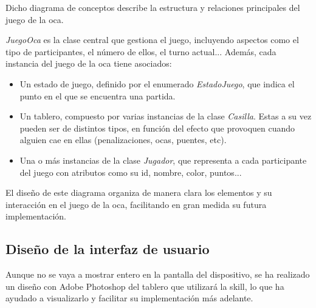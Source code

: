 Dicho diagrama de conceptos describe la estructura y relaciones principales del juego de la oca. 

\textit{JuegoOca} es la clase central que gestiona el juego, incluyendo aspectos como el tipo de participantes, el número de ellos, el turno actual... Además, cada instancia del juego de la oca tiene asociados:
\begin{itemize}
	\item Un estado de juego, definido por el enumerado \textit{EstadoJuego}, que indica el punto en el que se encuentra una partida.
	\item Un tablero, compuesto por varias instancias de la clase \textit{Casilla}. Estas a su vez pueden ser de distintos tipos, en función del efecto que provoquen cuando alguien cae en ellas (penalizaciones, ocas, puentes, etc).
	\item Una o más instancias de la clase \textit{Jugador}, que representa a cada participante del juego con atributos como su id, nombre, color, puntos...
\end{itemize}

El diseño de este diagrama organiza de manera clara los elementos y su interacción en el juego de la oca, facilitando en gran medida su futura implementación.

\newpage 

\subsection{Diseño de la interfaz de usuario}

Aunque no se vaya a mostrar entero en la pantalla del dispositivo, se ha realizado un diseño con Adobe Photoshop del tablero que utilizará la skill, lo que ha ayudado a visualizarlo y facilitar su implementación más adelante.

